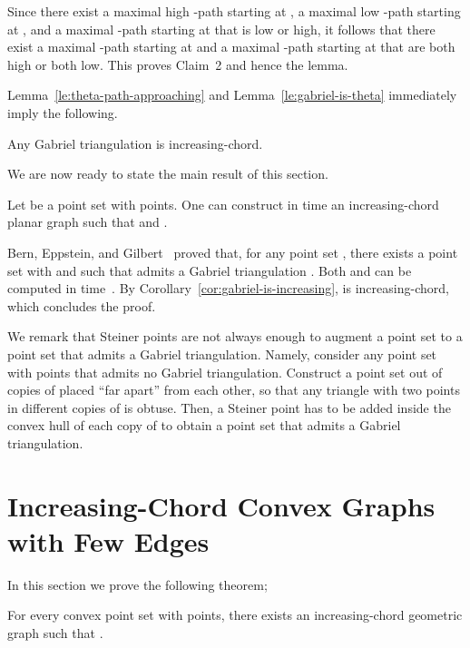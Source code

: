 \documentclass{llncs}
\renewenvironment{proof}
{{\bf Proof:}}{\hspace*{\fill}\par\vspace{2mm}}
\begin{document}
\begin{proof}
Since there exist a maximal high -path starting at , a maximal low -path starting at , and a maximal -path starting at  that is low or high, it follows that there exist a maximal -path  starting at  and a maximal -path  starting at  that are both high or both low. This proves Claim~2 and hence the lemma.
\end{proof}



Lemma~\ref{le:theta-path-approaching} and Lemma~\ref{le:gabriel-is-theta} immediately imply the following.

\begin{corollary}\label{cor:gabriel-is-increasing}
Any Gabriel triangulation is increasing-chord.
\end{corollary}

We are now ready to state the main result of this section.

\begin{theorem} \label{th:steiner}
Let  be a point set with  points.
One can construct in  time an increasing-chord planar graph  such that  and .
\end{theorem}
\begin{proof}
Bern, Eppstein, and Gilbert~\cite{beg-pgmg-94} proved that, for any point set , there exists a point set  with  and  such that  admits a Gabriel triangulation . Both  and  can be computed in  time~\cite{beg-pgmg-94}. By Corollary~\ref{cor:gabriel-is-increasing},  is increasing-chord, which concludes the proof.
\end{proof}

We remark that  Steiner points are not always enough to augment a point set  to a point set that admits a Gabriel triangulation. Namely, consider any point set  with  points that admits no Gabriel triangulation. Construct a point set  out of  copies of  placed ``far apart'' from each other, so that any triangle with two points in different copies of  is obtuse. Then, a Steiner point has to be added inside the convex hull of each copy of  to obtain a point set that admits a Gabriel triangulation.


\section{Increasing-Chord Convex Graphs with Few Edges}

In this section we prove the following theorem;

\begin{theorem} \label{th:convex-non-planar}
For every convex point set  with  points, there exists an increasing-chord geometric graph  such that .
\end{theorem}
\end{document}
